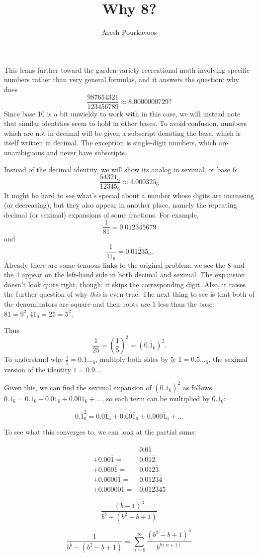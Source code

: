 \documentclass{article}
\begin{document}
\title{Why 8?}
\author{Aresh Pourkavoos}
\maketitle

This leans further toward the garden-variety recreational math
involving specific numbers rather than very general formulas,
and it answers the question: why does
\[\frac{987654321}{123456789} \approx 8.0000000729?\]
Since base 10 is a bit unwieldy to work with in this case,
we will instead note that similar identities seem to hold in other bases.
To avoid confusion, numbers which are not in decimal
will be given a subscript denoting the base,
which is itself written in decimal.
The exception is single-digit numbers, which are unambiguous
and never have subscripts.

Instead of the decimal identity,
we will show its analog in seximal, or base 6:
\[\frac{54321_6}{12345_6} \approx 4.000325_6\]
It might be hard to see what's special
about a number whose digits are increasing (or decreasing),
but they also appear in another place,
namely the repeating decimal (or seximal) expansions of some fractions.
For example,
\[\frac{1}{81} = 0.\overline{012345679}\]
and
\[\frac{1}{41_6} = 0.\overline{01235}_6.\]
Already there are some tenuous links to the original problem:
we see the 8 and the 4 appear on the left-hand side
in both decimal and seximal.
The expansion doesn't look quite right, though:
it skips the corresponding digit.
Also, it raises the further question
of why \textit{this} is even true.
The next thing to see is that both of the denominators are square
and their roots are 1 less than the base:
$81=9^2, 41_6=25=5^2$.

Thus
\[\frac{1}{25}=\left(\frac{1}{5}\right)^2=(0.\overline{1}_6)^2.\]
To understand why $\frac{1}{5}=0.\overline{1}\ldots_6$,
multiply both sides by 5:
$1=0.\overline{5}\ldots_6$,
the seximal version of the identity $1=0.\overline{9}\ldots$.

Given this, we can find the seximal expansion of $(0.\overline{1}_6)^2$
as follows.
$0.\overline{1}_6=0.1_6+0.01_6+0.001_6+\ldots$,
so each term can be multiplied by $0.\overline{1}_6$:

\[0.\overline{1}_6^2 = 0.0\overline{1}_6+0.00\overline{1}_6+0.000\overline{1}_6+\ldots\]

To see what this converges to, we can look at the partial sums:

\begin{align*}
  & 0.0\overline{1} \\
  + 0.00\overline{1} =& 0.01\overline{2} \\
  + 0.000\overline{1} =& 0.012\overline{3} \\
  + 0.0000\overline{1} =& 0.0123\overline{4} \\
  + 0.00000\overline{1} =& 0.01234\overline{5}
\end{align*}


\[\frac{(b-1)^3}{b^b-(b^2-b+1)}\]

\[\frac{1}{b^b-(b^2-b+1)} = \sum_{n=0}^\infty \frac{(b^2-b+1)^n}{b^{b(n+1)}} \]
\end{document}
